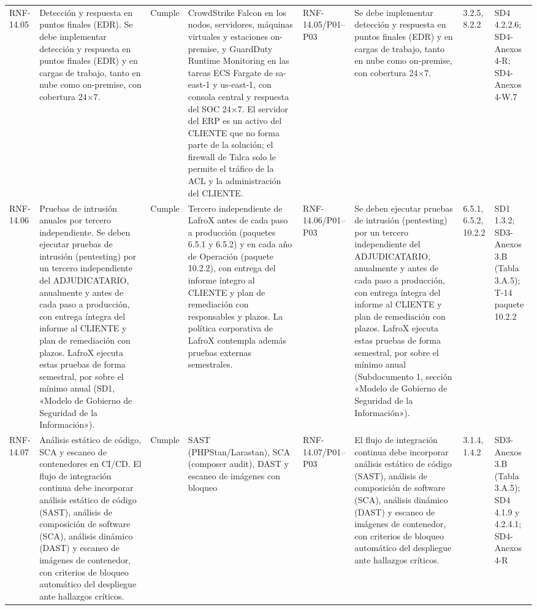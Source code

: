 \documentclass[oficio,firma,final]{lafrox}
\begin{document}
\begin{landscape}
{\begin{longtable}{@{}F{0.054} F{0.173} F{0.061} F{0.191} F{0.106} F{0.180} F{0.067} F{0.168}@{}}
  RNF-14.05 & Detección y respuesta en puntos finales (EDR). Se debe implementar detección y respuesta en puntos finales (EDR) y en cargas de trabajo, tanto en nube como on-premise, con cobertura 24$\times$7. & Cumple & CrowdStrike Falcon en los nodos, servidores, máquinas virtuales y estaciones on-premise, y GuardDuty Runtime Monitoring en las tareas ECS Fargate de sa-east-1 y us-east-1, con consola central y respuesta del SOC 24$\times$7. El servidor del ERP es un activo del CLIENTE que no forma parte de la solución; el firewall de Talca solo le permite el tráfico de la ACL y la administración del CLIENTE. & RNF-14.05/\allowbreak{}P01--\allowbreak{}P03 & Se debe implementar detección y respuesta en puntos finales (EDR) y en cargas de trabajo, tanto en nube como on-premise, con cobertura 24$\times$7. & 3.2.5, 8.2.2 & SD4 4.2.2.6; SD4-Anexos 4-R; SD4-Anexos 4-W.7  \\
  RNF-14.06 & Pruebas de intrusión anuales por tercero independiente. Se deben ejecutar pruebas de intrusión (pentesting) por un tercero independiente del ADJUDICATARIO, anualmente y antes de cada paso a producción, con entrega íntegra del informe al CLIENTE y plan de remediación con plazos. LafroX ejecuta estas pruebas de forma semestral, por sobre el mínimo anual (SD1, «Modelo de Gobierno de Seguridad de la Información»). & Cumple & Tercero independiente de LafroX antes de cada paso a producción (paquetes 6.5.1 y 6.5.2) y en cada año de Operación (paquete 10.2.2), con entrega del informe íntegro al CLIENTE y plan de remediación con responsables y plazos. La política corporativa de LafroX contempla además pruebas externas semestrales. & RNF-14.06/\allowbreak{}P01--\allowbreak{}P03 & Se deben ejecutar pruebas de intrusión (pentesting) por un tercero independiente del ADJUDICATARIO, anualmente y antes de cada paso a producción, con entrega íntegra del informe al CLIENTE y plan de remediación con plazos. LafroX ejecuta estas pruebas de forma semestral, por sobre el mínimo anual (Subdocumento 1, sección «Modelo de Gobierno de Seguridad de la Información»). & 6.5.1, 6.5.2, 10.2.2 & SD1 1.3.2; SD3-Anexos 3.B (Tabla 3.A.5); T-14 paquete 10.2.2 \\
  RNF-14.07 & Análisis estático de código, SCA y escaneo de contenedores en CI/CD. El flujo de integración continua debe incorporar análisis estático de código (SAST), análisis de composición de software (SCA), análisis dinámico (DAST) y escaneo de imágenes de contenedor, con criterios de bloqueo automático del despliegue ante hallazgos críticos. & Cumple & SAST (PHPStan/Larastan), SCA (composer audit), DAST y escaneo de imágenes con bloqueo & RNF-14.07/\allowbreak{}P01--\allowbreak{}P03 & El flujo de integración continua debe incorporar análisis estático de código (SAST), análisis de composición de software (SCA), análisis dinámico (DAST) y escaneo de imágenes de contenedor, con criterios de bloqueo automático del despliegue ante hallazgos críticos. & 3.1.4, 1.4.2 & SD3-Anexos 3.B (Tabla 3.A.5); SD4 4.1.9 y 4.2.4.1; SD4-Anexos 4-R  \\

\end{longtable}}
\end{landscape}
\end{document}
